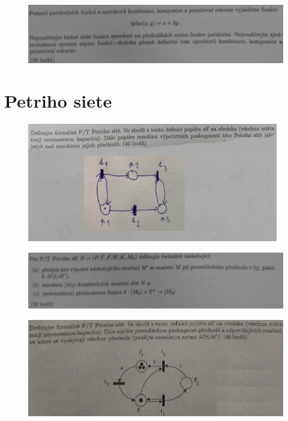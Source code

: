 \documentclass[]{article}
\begin{document}
	\begin{figure}[H]
		\includegraphics[width=\textwidth]{tasks/funkcie/task1.png}
	\end{figure}

	\section{Petriho siete}
	
	\begin{figure}[H]
		\includegraphics[width=\textwidth]{tasks/petri/task1.png}
	\end{figure}

	\begin{figure}[H]
		\includegraphics[width=\textwidth]{tasks/petri/task2.png}
	\end{figure}

	\begin{figure}[H]
		\includegraphics[width=\textwidth]{tasks/petri/task3.png}
	\end{figure}

	
\end{document}
